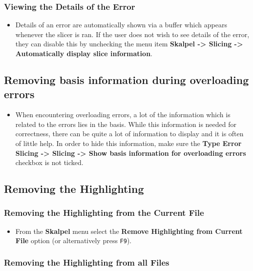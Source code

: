 \documentclass{report}
\begin{document}
\subsubsection{Viewing the Details of the Error}

\begin{itemize}
\item Details of an error are automatically shown via a buffer which
  appears whenever the slicer is ran. If the user does not wish to see
  details of the error, they can disable this by unchecking the menu
  item \textbf{Skalpel -> Slicing -> Automatically display
    slice information}.
\end{itemize}

\subsection{Removing basis information during overloading errors}
\begin{itemize}
\item When encountering overloading errors, a lot of the information
  which is related to the errors lies in the basis. While this
  information is needed for correctness, there can be quite a lot of
  information to display and it is often of little help. In order to
  hide this information, make sure the \textbf{Type Error Slicing ->
    Slicing -> Show basis information for overloading errors} checkbox
  is not ticked.
\end{itemize}


\subsection{Removing the Highlighting}

\subsubsection{Removing the Highlighting from the Current File}

\begin{itemize}
\item From the \textbf{Skalpel} menu select the \textbf{Remove
  Highlighting from Current File} option (or alternatively press
  \texttt{F9}).
\end{itemize}

\subsubsection{Removing the Highlighting from all Files}
\end{document}
